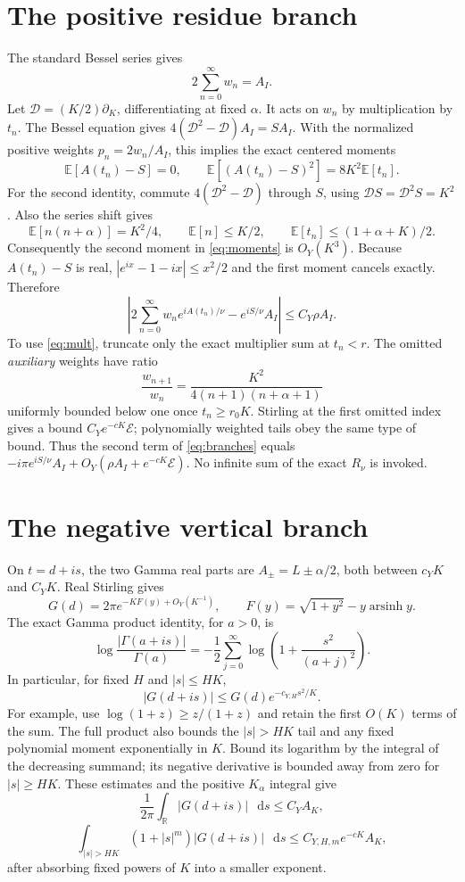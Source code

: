 \documentclass[11pt,a4paper]{article}
\newcommand{\dd}{\mathop{}\!\mathrm d}
\newcommand{\E}{\mathcal E}
\newcommand{\D}{\mathcal D}
\begin{document}
\section{The positive residue branch}
The standard Bessel series \cite{Bessel} gives
\[
 2\sum_{n=0}^\infty w_n=A_I.
\]
Let \(\D=(K/2)\partial_K\), differentiating at fixed \(\alpha\).
It acts on \(w_n\) by multiplication by \(t_n\).
The Bessel equation gives \(4(\D^2-\D)A_I=SA_I\).
With the normalized positive weights \(p_n=2w_n/A_I\), this implies
the exact centered moments
\begin{equation}\label{eq:moments}
 \mathbb E[A(t_n)-S]=0,\qquad
 \mathbb E[(A(t_n)-S)^2]=8K^2\mathbb E[t_n].
\end{equation}
For the second identity, commute \(4(\D^2-\D)\) through \(S\),
using \(\D S=\D^2S=K^2\). Also the series shift gives
\[
 \mathbb E[n(n+\alpha)]=K^2/4,\qquad
 \mathbb E[n]\le K/2,\qquad
 \mathbb E[t_n]\le(1+\alpha+K)/2.
\]
Consequently the second moment in \eqref{eq:moments} is \(O_Y(K^3)\).
Because \(A(t_n)-S\) is real, \(|e^{ix}-1-ix|\le x^2/2\)
and the first moment cancels exactly. Therefore
\begin{equation}\label{eq:Iphase}
 \left|2\sum_{n=0}^\infty w_ne^{iA(t_n)/\nu}
       -e^{iS/\nu}A_I\right|\le C_Y\rho A_I.
\end{equation}
To use \eqref{eq:mult}, truncate only the exact multiplier sum at
\(t_n<r\). The omitted \emph{auxiliary} weights have ratio
\[
 \frac{w_{n+1}}{w_n}=\frac{K^2}{4(n+1)(n+\alpha+1)}
\]
uniformly bounded below one once \(t_n\ge r_0K\).
Stirling at the first omitted index gives a bound
\(C_Ye^{-cK}\E\); polynomially weighted tails obey the same type of
bound. Thus the second term of \eqref{eq:branches} equals
\(-i\pi e^{iS/\nu}A_I+
O_Y(\rho A_I+e^{-cK}\E)\).
No infinite sum of the exact \(R_\nu\) is invoked.

\section{The negative vertical branch}
On \(t=d+is\), the two Gamma real parts are
\(A_\pm=L\pm\alpha/2\), both between \(c_YK\) and \(C_YK\).
Real Stirling gives
\[
 G(d)=2\pi e^{-KF(y)+O_Y(K^{-1})},\qquad
 F(y)=\sqrt{1+y^2}-y\operatorname{arsinh}y.
\]
The exact Gamma product identity, for \(a>0\), is
\[
 \log\frac{|\Gamma(a+is)|}{\Gamma(a)}
 =-\frac12\sum_{j=0}^\infty
       \log\!\left(1+\frac{s^2}{(a+j)^2}\right).
\]
In particular, for fixed \(H\) and \(|s|\le HK\),
\begin{equation}\label{eq:gauss}
 |G(d+is)|\le G(d)e^{-c_{Y,H}s^2/K}.
\end{equation}
For example, use \(\log(1+z)\ge z/(1+z)\) and retain the first
\(O(K)\) terms of the sum. The full product also bounds the
\(|s|>HK\) tail and any fixed polynomial moment exponentially in
\(K\). Bound its logarithm by the integral of the decreasing
summand; its negative derivative is bounded away from zero
for \(|s|\ge HK\). These estimates and the positive \(K_\alpha\)
integral give
\[
 \frac1{2\pi}\int_{\mathbb R}|G(d+is)|\,\dd s\le C_Y A_K,
\]
\[
 \int_{|s|>HK}(1+|s|^m)|G(d+is)|\,\dd s
 \le C_{Y,H,m}e^{-cK}A_K,
\]
after absorbing fixed powers of \(K\) into a smaller exponent.
\end{document}
